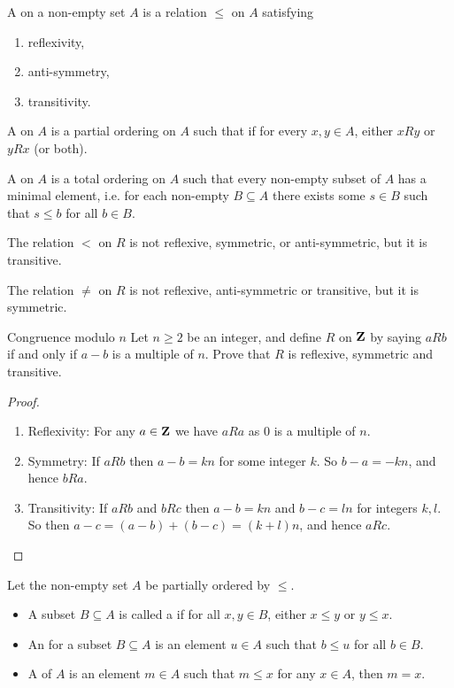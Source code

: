 \begin{definition}
A  on a non-empty set $A$ is a relation $\le$ on $A$ satisfying
\begin{enumerate}[label=(\roman*)]
\item reflexivity,
\item anti-symmetry,
\item transitivity.
\end{enumerate} 

A  on $A$ is a partial ordering on $A$ such that if for every $x, y \in A$, either $xRy$ or $yRx$ (or both).

A  on $A$ is a total ordering on $A$ such that every non-empty subset of $A$ has a minimal element, i.e. for each non-empty $B\subseteq A$ there exists some $s\in B$ such that $s\le b$ for all $b\in B$.
\end{definition}

\begin{example}
The relation $<$ on $R$ is not reflexive, symmetric, or anti-symmetric, but it is transitive.
\end{example}

\begin{example}
The relation $\neq$ on $R$ is not reflexive, anti-symmetric or transitive, but it is symmetric.
\end{example}

\begin{exercise}{Congruence modulo $n$}{}
Let $n \ge 2$ be an integer, and define $R$ on $\mathbf Z$ by saying $aRb$ if and only if $a-b$ is a multiple of $n$. Prove that $R$ is reflexive, symmetric and transitive.
\end{exercise}
\begin{proof} \
\begin{enumerate}[label=(\roman*)]
\item Reflexivity: For any $a \in \mathbf Z$ we have $aRa$ as 0 is a multiple of $n$.
\item Symmetry: If $aRb$ then $a-b=kn$ for some integer $k$. So $b-a=-kn$, and hence $bRa$.
\item Transitivity: If $aRb$ and $bRc$ then $a-b=kn$ and $b-c=ln$ for integers $k,l$. So then $a-c=(a-b)+(b-c)=(k+l)n$, and hence $aRc$.
\end{enumerate}
\end{proof}

\begin{definition}
Let the non-empty set $A$ be partially ordered by $\le$.
\begin{itemize}
\item A subset $B\subseteq A$ is called a  if for all $x,y\in B$, either $x\le y$ or $y\le x$.
\item An \vocab{upper bound} for a subset $B\subseteq A$ is an element $u\in A$ such that $b\le u$ for all $b\in B$.
\item A \vocab{maximal element} of $A$ is an element $m\in A$ such that $m\le x$ for any $x\in A$, then $m=x$.
\end{itemize}
\end{definition}

